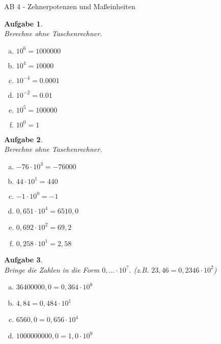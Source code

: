 \documentclass[12pt,fleqn]{article}
\theoremstyle{aufg}
\newtheorem{aufgabe}{Aufgabe}
\theoremstyle{bsp}
\begin{document}
 
    \begin{flushleft}
\begin{center}AB 4 - Zehnerpotenzen und Ma\ss{}einheiten\end{center}\begin{aufgabe} ~ \\ 
Berechne ohne Taschenrechner. \\ 
\begin{multicols}{3} 
\begin{enumerate}[a)] 
\item 
$10^{6}=1000000$
\item 
$10^{4}=10000$
\item 
$10^{-4}=0.0001$
\item 
$10^{-2}=0.01$
\item 
$10^{5}=100000$
\item 
$10^{0}=1$
\end{enumerate} 
\end{multicols} 
\end{aufgabe} 
\begin{aufgabe} ~ \\ 
Berechne ohne Taschenrechner. \\ 
\begin{multicols}{3} 
\begin{enumerate}[a)] 
\item 
$-76\cdot10^{3}=-76000$
\item 
$44\cdot10^{1}=440$
\item 
$-1\cdot10^{0}=-1$
\item 
$0,651\cdot10^{4}=6510,0$
\item 
$0,692\cdot10^{2}=69,2$
\item 
$0,258\cdot10^{1}=2,58$
\end{enumerate} 
\end{multicols} 
\end{aufgabe} 
\begin{aufgabe} ~ \\ 
Bringe die Zahlen in die Form $0,... \cdot 10^{?}$. (z.B. $23,46 = 0,2346 \cdot 10^2$) \\ 
\begin{multicols}{3} 
\begin{enumerate}[a)] 
\item 
$36400000,0=$$0,364\cdot10^{8}$
\item 
$4,84=$$0,484\cdot10^{1}$
\item 
$6560,0=$$0,656\cdot10^{4}$
\item 
$1000000000,0=$$1,0\cdot10^{9}$

\end{enumerate}
\end{multicols}
\end{aufgabe}
\end{flushleft}
\end{document}
